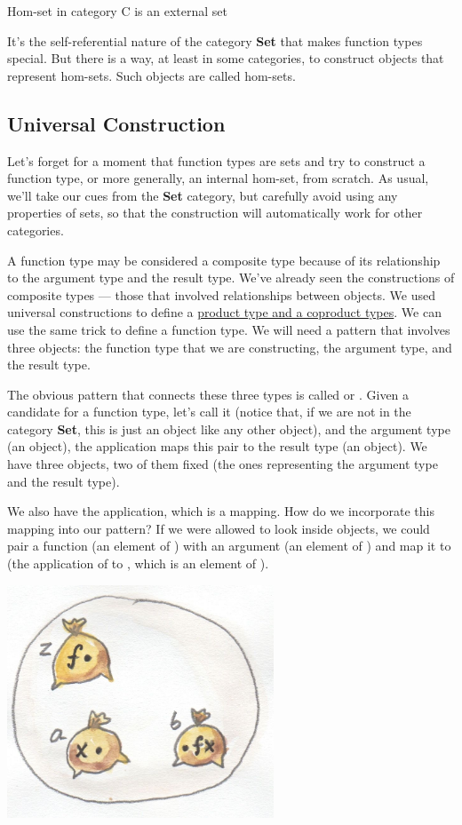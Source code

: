 Hom-set in category C is an external set

It's the self-referential nature of the category \textbf{Set} that makes
function types special. But there is a way, at least in some categories,
to construct objects that represent hom-sets. Such objects are called
 hom-sets.

\subsection{Universal Construction}\label{universal-construction}

Let's forget for a moment that function types are sets and try to
construct a function type, or more generally, an internal hom-set, from
scratch. As usual, we'll take our cues from the \textbf{Set} category,
but carefully avoid using any properties of sets, so that the
construction will automatically work for other categories.

A function type may be considered a composite type because of its
relationship to the argument type and the result type. We've already
seen the constructions of composite types --- those that involved
relationships between objects. We used universal constructions to define
a
\href{https://bartoszmilewski.com/2015/01/07/products-and-coproducts/}{product
type and a coproduct types}. We can use the same trick to define a
function type. We will need a pattern that involves three objects: the
function type that we are constructing, the argument type, and the
result type.

The obvious pattern that connects these three types is called
 or . Given a candidate for
a function type, let's call it  (notice that, if we are not in
the category \textbf{Set}, this is just an object like any other
object), and the argument type  (an object), the application
maps this pair to the result type  (an object). We have three
objects, two of them fixed (the ones representing the argument type and
the result type).

We also have the application, which is a mapping. How do we incorporate
this mapping into our pattern? If we were allowed to look inside
objects, we could pair a function  (an element of )
with an argument  (an element of ) and map it to
 (the application of  to , which is an
element of ).

\hypertarget{attachment_4243}{}
\includegraphics[width=3.12500in]{images/functionset.jpg}

